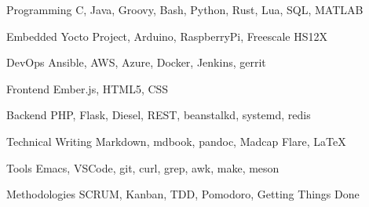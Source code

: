 

\begin{cvskills}

  \cvskill
    {Programming} %
    {C, Java, Groovy, Bash, Python, Rust, Lua, SQL, MATLAB} %

  \cvskill
    {Embedded}
    {Yocto Project, Arduino, RaspberryPi, Freescale HS12X}

  \cvskill
    {DevOps} %
    {Ansible, AWS, Azure, Docker, Jenkins, gerrit} %

  \cvskill
    {Frontend} %
    {Ember.js, HTML5, CSS} %

  \cvskill
    {Backend} %
    {PHP, Flask, Diesel, REST, beanstalkd, systemd, redis} %

  \cvskill
    {Technical Writing} %
    {Markdown, mdbook, pandoc, Madcap Flare, LaTeX} %


  \cvskill
    {Tools}
    {Emacs, VSCode, git, curl, grep, awk, make, meson}


  \cvskill
    {Methodologies} %
    {SCRUM, Kanban, TDD, Pomodoro, Getting Things Done} %

\end{cvskills}
